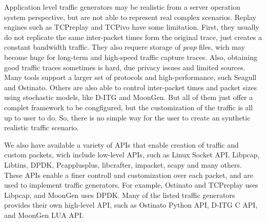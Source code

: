 Application level traffic generators may be realistic from a server operation system perspective, but are not able to represent real complex scenarios. Replay engines such as  TCPreplay and TCPivo have some limitation. First, they usually do not replicate the same inter-packet times form the original trace, just creates a constant bandwidth traffic. They also requere storage of \textit{pcap} files, wich may become huge for  long-term and high-speed traffic capture traces. Also, obtaining good traffic traces sometimes is hard, due privacy issues and limited sources.  Many tools support a larger set of protocols and high-performance, such Seagull and Ostinato. Others are also able to control inter-packet times and packet sizes using stochastic models, like D-ITG\cite{ditg-paper} and MoonGen. But all of them just offer a complet framework to be congfigured, but the customization of the traffic is all up to user to do. So, there is no simple way for the user to create an synthetic realistic traffic scenario. 

We also have available a variety of APIs that enable creation of traffic and custom packets, wich include low-level APIs, such as Linux Socket API,  Libpcap, Libtins, DPDK, Pcapplusplus, libcrafter, impacket, scapy and many others. These APIs enable a finer controll and customization over each packet, and are used to implement traffic generators. For example, Ostinato and TCPreplay uses Libpcap, and MoonGen uses DPDK. Many of the listed traffic generators provides their own high-level API, such as Ostinato Python API, D-ITG C API, and MoonGen LUA API. 




